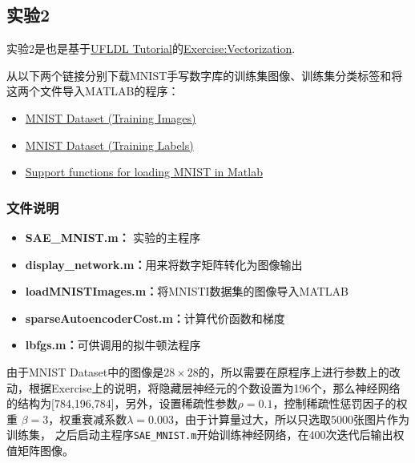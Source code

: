 \subsection{实验2}
实验2是也是基于\href{http://ufldl.stanford.edu/wiki/index.php/UFLDL_Tutorial}{UFLDL Tutorial}的\href{http://ufldl.stanford.edu/wiki/index.php/Exercise:Vectorization}{Exercise:Vectorization}.

从以下两个链接分别下载MNIST手写数字库的训练集图像、训练集分类标签和将这两个文件导入MATLAB的程序：
\begin{itemize}
\item \href{http://yann.lecun.com/exdb/mnist/train-images-idx3-ubyte.gz}{MNIST Dataset (Training Images)}
\item \href{http://yann.lecun.com/exdb/mnist/train-labels-idx1-ubyte.gz}{MNIST Dataset (Training Labels)}
\item \href{http://ufldl.stanford.edu/wiki/resources/mnistHelper.zip}{Support functions for loading MNIST in Matlab}
\end{itemize}

\subsubsection*{文件说明}
\begin{itemize}
 \item \textbf{SAE\_MNIST.m：} 实验的主程序
  \item \textbf{display\_network.m：}用来将数字矩阵转化为图像输出
  \item \textbf{loadMNISTImages.m：}将MNISTI数据集的图像导入MATLAB
 \item \textbf{sparseAutoencoderCost.m：}计算代价函数和梯度
 \item \textbf{lbfgs.m：}可供调用的拟牛顿法程序
\end{itemize}

由于MNIST Dataset中的图像是$28\times28$的，所以需要在原程序上进行参数上的改动，根据Exercise上的说明，将隐藏层神经元的个数设置为196个，那么神经网络的结构为[784,196,784]，另外，设置稀疏性参数$\rho=0.1$，控制稀疏性惩罚因子的权重 $ \beta =3$，权重衰减系数$\lambda=0.003$，由于计算量过大，所以只选取5000张图片作为训练集，
之后启动主程序\verb|SAE_MNIST.m|开始训练神经网络，在400次迭代后输出权值矩阵图像。

